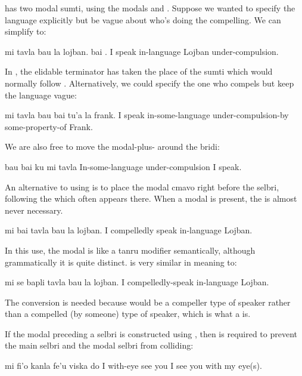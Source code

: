  has two modal sumti, using the
    modals  and . Suppose we wanted to specify the
    language explicitly but be vague about who's doing the
    compelling. We can simplify  to:
\begin{example}
mi tavla bau la lojban. bai .\n
I speak in-language Lojban under-compulsion.
\end{example}

In , the elidable terminator
     has taken the place of the sumti which would normally
    follow . Alternatively, we could specify the one who
    compels but keep the language vague:
\begin{example}
mi tavla bau \n
\T	bai tu'a la frank.\n
I speak in-some-language\n
\T	under-compulsion-by some-property-of Frank.
\end{example}

We are also free to move the modal-plus- around the
    bridi:
\begin{example}
bau  bai ku mi tavla\n
In-some-language under-compulsion I speak.
\end{example}

An alternative to using  is to place the modal cmavo
    right before the selbri, following the  which often
    appears there. When a modal is present, the  is almost
    never necessary.
\begin{example}
mi bai tavla bau la lojban.\n
I compelledly speak in-language Lojban.
\end{example}

In this use, the modal is like a tanru modifier semantically,
    although grammatically it is quite distinct.  is very similar in meaning to:
\begin{example}
mi se bapli tavla bau la lojban.\n
I compelledly-speak in-language Lojban.
\end{example}

The  conversion is needed because 
    would be a compeller type of speaker rather than a compelled
    (by someone) type of speaker, which is what a 
    is.

If the modal preceding a selbri is constructed using
    , then  is required to prevent the main selbri
    and the modal selbri from colliding:
\begin{example}
mi fi'o kanla fe'u viska do\n
I with-eye see you\n
I see you with my eye(s).
\end{example}

